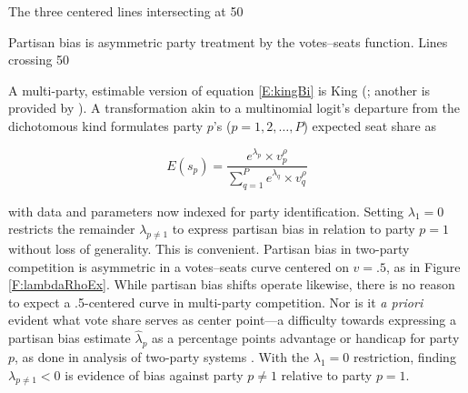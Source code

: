 \documentclass[letter,12pt]{article}
\begin{document}
The three centered lines intersecting at 50%

Partisan bias is asymmetric party treatment by the votes--seats function. Lines crossing 50%


A multi-party, estimable version of equation \ref{E:kingBi} is King (\citeyear{king.1990elRespBiasMultiparty}; another is provided by \citeauthor{calvo.micozzi.govReform.2005} \citeyear{calvo.micozzi.govReform.2005}). A transformation akin to a multinomial logit's departure from the dichotomous kind formulates party $p$'s ($p=1,2,\ldots,P$) expected seat share as 

\begin{equation}\label{E:kingMulti}
 E(s_p) = \frac{e^{\lambda_p} \times v_p^\rho}{\sum_{q=1}^{P} e^{\lambda_q} \times v_q^\rho}
\end{equation}

\noindent with data and parameters now indexed for party identification. Setting $\lambda_1 = 0$ restricts the remainder $\lambda_{p \neq 1}$ to express partisan bias in relation to party $p=1$ without loss of generality. This is convenient. Partisan bias in two-party competition is asymmetric in a votes--seats curve centered on $v=.5$, as in Figure \ref{F:lambdaRhoEx}. While partisan bias shifts operate likewise, there is no reason to expect a .5-centered curve in multi-party competition. Nor is it \emph{a priori} evident what vote share serves as center point---a difficulty towards expressing a partisan bias estimate $\hat{\lambda}_p$ as a percentage points advantage or handicap for party $p$, as done in analysis of two-party systems \citep[e.g.,][]{cox.katz.2002}. With the $\lambda_1 = 0$ restriction, finding $\lambda_{p \neq 1}<0$ is evidence of bias against party $p \neq 1$ relative to party $p=1$.
\end{document}
